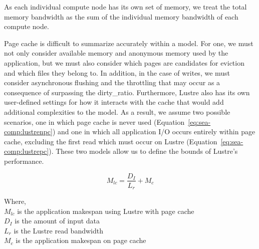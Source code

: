 \documentclass[10pt,journal,compsoc]{IEEEtran}
\begin{document}
       As each individual compute node has its own set of memory, we treat the
      total memory bandwidth as the sum of the individual memory bandwidth of
      each compute node.


      Page cache is difficult to summarize accurately within a
      model. For one, we must not only consider available memory and anonymous
      memory used by the application, but we must also consider which pages are
      candidates for eviction and which files they belong to. In addition, in
      the case of writes, we must consider asynchronous flushing and the
      throttling that may occur as a consequence of surpassing the
      dirty\_ratio. Furthermore, Lustre also has its own user-defined
      settings for how it interacts with the cache that would add additional
      complexities to the model. As a result, we assume two possible scenarios,
      one in which page cache is never used
      (Equation~\ref{eq:sea-comp:lustrenpc}) and one in which all application
      I/O occurs entirely within page cache, excluding the first read which must
      occur on Lustre (Equation~\ref{eq:sea-comp:lustrepc}). These two models
      allow us to define the bounds of Lustre's performance.

      \begin{equation}\label{eq:sea-comp:lustrepc}
          M_{lc} = \frac{D_{I}}{L_{r}} + M_{c}
      \end{equation}

      {\noindent} Where, \\
      $M_{lc}$ is the application makespan using Lustre with page cache \\
      $D_{I}$ is the amount of input data \\
      $L_{r}$ is the Lustre read bandwidth \\
      $M_{c}$ is the application makespan on page cache \\


\end{document}
